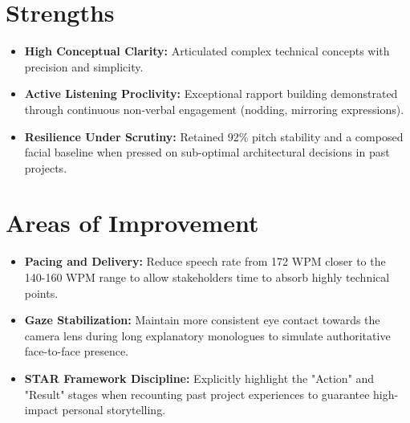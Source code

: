 \documentclass[11pt,a4paper]{article}
\begin{document}
\section{Strengths}
\begin{tcolorbox}[colframe=GreenDark, colback=GreenBg!20, boxrule=0.5pt, arc=3pt, left=5pt]
\begin{itemize}[leftmargin=1.5em, itemsep=0.4em, label=\textcolor{GreenDark}{\(\bullet\)}]
  \item \textbf{High Conceptual Clarity:} Articulated complex technical concepts with precision and simplicity.
  \item \textbf{Active Listening Proclivity:} Exceptional rapport building demonstrated through continuous non-verbal engagement (nodding, mirroring expressions).
  \item \textbf{Resilience Under Scrutiny:} Retained 92\% pitch stability and a composed facial baseline when pressed on sub-optimal architectural decisions in past projects.
\end{itemize}
\end{tcolorbox}

\section{Areas of Improvement}
\begin{tcolorbox}[colframe=WiseBorder, colback=white, boxrule=0.5pt, arc=3pt, left=5pt]
\begin{itemize}[leftmargin=1.5em, itemsep=0.4em, label=\textcolor{WiseGray}{\(\bullet\)}]
  \item \textbf{Pacing and Delivery:} Reduce speech rate from 172 WPM closer to the 140-160 WPM range to allow stakeholders time to absorb highly technical points.
  \item \textbf{Gaze Stabilization:} Maintain more consistent eye contact towards the camera lens during long explanatory monologues to simulate authoritative face-to-face presence.
  \item \textbf{STAR Framework Discipline:} Explicitly highlight the "Action" and "Result" stages when recounting past project experiences to guarantee high-impact personal storytelling.
\end{itemize}
\end{tcolorbox}
\end{document}
